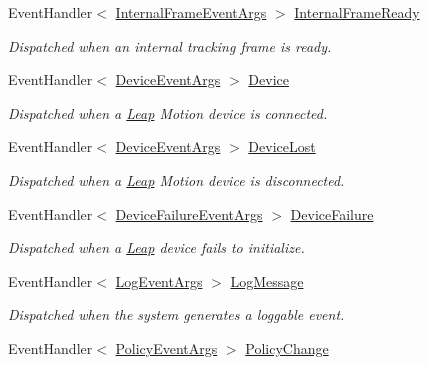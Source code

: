 \begin{DoxyCompactItemize}
Event\+Handler$<$ \mbox{\hyperlink{class_leap_1_1_internal_frame_event_args}{Internal\+Frame\+Event\+Args}} $>$ \mbox{\hyperlink{class_leap_1_1_controller_a0713d49768905ceba0ffb63ecc216aa1}{Internal\+Frame\+Ready}}
\begin{DoxyCompactList}\small\item\em Dispatched when an internal tracking frame is ready. \end{DoxyCompactList}\item 
Event\+Handler$<$ \mbox{\hyperlink{class_leap_1_1_device_event_args}{Device\+Event\+Args}} $>$ \mbox{\hyperlink{class_leap_1_1_controller_ac9a2f80c418e12b42b8331c0d5b116b1}{Device}}
\begin{DoxyCompactList}\small\item\em Dispatched when a \mbox{\hyperlink{namespace_leap}{Leap}} Motion device is connected. \end{DoxyCompactList}\item 
Event\+Handler$<$ \mbox{\hyperlink{class_leap_1_1_device_event_args}{Device\+Event\+Args}} $>$ \mbox{\hyperlink{class_leap_1_1_controller_a1f624439c16ddaf866ac657aa811a622}{Device\+Lost}}
\begin{DoxyCompactList}\small\item\em Dispatched when a \mbox{\hyperlink{namespace_leap}{Leap}} Motion device is disconnected. \end{DoxyCompactList}\item 
Event\+Handler$<$ \mbox{\hyperlink{class_leap_1_1_device_failure_event_args}{Device\+Failure\+Event\+Args}} $>$ \mbox{\hyperlink{class_leap_1_1_controller_aebe559b634e766a31c1f2041714313ca}{Device\+Failure}}
\begin{DoxyCompactList}\small\item\em Dispatched when a \mbox{\hyperlink{namespace_leap}{Leap}} device fails to initialize. \end{DoxyCompactList}\item 
Event\+Handler$<$ \mbox{\hyperlink{class_leap_1_1_log_event_args}{Log\+Event\+Args}} $>$ \mbox{\hyperlink{class_leap_1_1_controller_a40c12ae7c232621b91f9bb40987a33a3}{Log\+Message}}
\begin{DoxyCompactList}\small\item\em Dispatched when the system generates a loggable event. \end{DoxyCompactList}\item 
Event\+Handler$<$ \mbox{\hyperlink{class_leap_1_1_policy_event_args}{Policy\+Event\+Args}} $>$ \mbox{\hyperlink{class_leap_1_1_controller_a0177e366833918615a05f1be4177c53b}{Policy\+Change}}

\end{DoxyCompactItemize}
